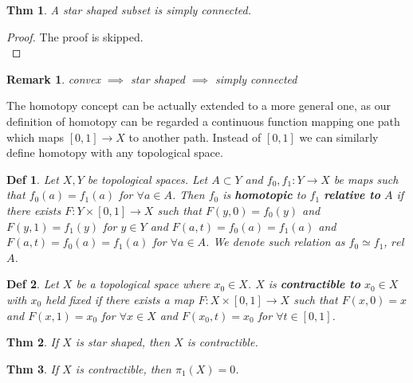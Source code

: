 \documentclass[paper=a4, fontsize=11pt]{scrartcl}
\newtheorem{theorem}{Thm}
\newtheorem{definition}{Def}
\newtheorem*{remark}{Remark}
\begin{document}
\begin{theorem}
	A star shaped subset is simply connected.
\end{theorem}

\begin{proof}
	The proof is skipped.\\
\end{proof}

\begin{remark}
	convex $\implies$ star shaped $\implies$ simply connected\\
\end{remark}

The homotopy concept can be actually extended to a more general one, as our definition of homotopy can be regarded a continuous function mapping one path which maps $[0,1]\to X$ to another path. Instead of $[0,1]$ we can similarly define homotopy with any topological space.\\ 

\begin{definition}
	Let $X,Y$ be topological spaces. Let $A\subset Y$ and $f_0,f_1:Y \to X$ be maps such that $f_0(a)=f_1(a)$ for $\forall a \in A$. Then $f_0$ is \textbf{homotopic} to $f_1$ \textbf{relative to} $A$ if there exists $F:Y\times[0,1]\to X$ such that $F(y,0)=f_0(y)$ and $F(y,1)=f_1(y)$ for $y\in Y$ and $F(a,t)=f_0(a)=f_1(a)$ and $F(a,t)=f_0(a)=f_1(a)$ for $\forall a \in A$. We denote such relation as $f_0 \simeq f_1$, $rel$ $A$.\\
\end{definition}

\begin{definition}
	Let $X$ be a topological space where $x_0 \in X$. $X$ is \textbf{contractible to} $x_0 \in X$ with $x_0$ held fixed if there exists a map $F:X\times[0,1]\to X$ such that $F(x,0)=x$ and $F(x,1)=x_0$ for $\forall x \in X$ and $F(x_0,t)=x_0$ for $\forall t \in [0,1]$.\\
\end{definition}

\begin{theorem}
	If $X$ is star shaped, then $X$ is contractible.
\end{theorem}

\begin{theorem}
	If $X$ is contractible, then $\pi_1(X)=0$.\\
\end{theorem}
\end{document}
